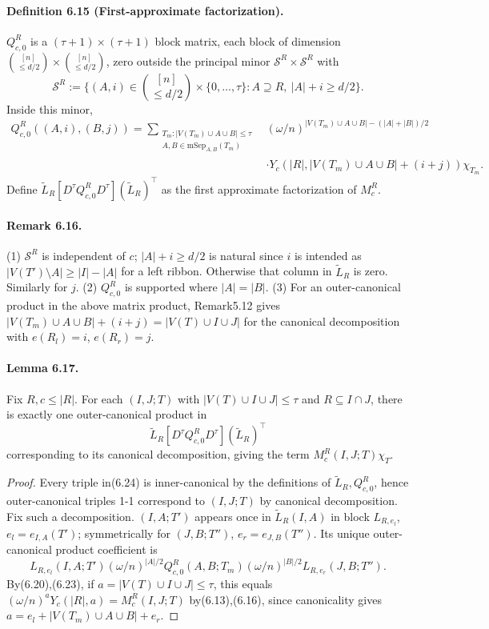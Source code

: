 \paragraph{Definition 6.15 (First-approximate factorization).} $Q_{c,0}^R$ is a $(\tau+1)\times(\tau+1)$ block matrix, each block of dimension $\binom{[n]}{\le d/2}\times\binom{[n]}{\le d/2}$, zero outside the principal minor $\mathcal S^R\times\mathcal S^R$ with
\[\mathcal S^R:=\{(A,i)\in\binom{[n]}{\le d/2}\times\{0,\ldots,\tau\}:A\supseteq R,\ |A|+i\ge d/2\}.\tag{6.22}\]
Inside this minor,
\begin{align*}Q_{c,0}^R((A,i),(B,j))=\sum_{\substack{T_m:|V(T_m)\cup A\cup B|\le\tau\\A,B\in\mathrm{mSep}_{A,B}(T_m)}}&(\omega/n)^{|V(T_m)\cup A\cup B|-(|A|+|B|)/2}\\&\cdot Y_c(|R|,|V(T_m)\cup A\cup B|+(i+j))\chi_{T_m}.\tag{6.23}\end{align*}
Define $\widetilde L_R[D^\tau Q_{c,0}^R D^\tau](\widetilde L_R)^\top$ as the first approximate factorization of $M_c^R$.
\paragraph{Remark 6.16.} (1) $\mathcal S^R$ is independent of $c$; $|A|+i\ge d/2$ is natural since $i$ is intended as $|V(T')\setminus A|\ge|I|-|A|$ for a left ribbon. Otherwise that column in $\widetilde L_R$ is zero. Similarly for $j$. (2) $Q_{c,0}^R$ is supported where $|A|=|B|$. (3) For an outer-canonical product in the above matrix product, Remark5.12 gives $|V(T_m)\cup A\cup B|+(i+j)=|V(T)\cup I\cup J|$ for the canonical decomposition with $e(R_l)=i$, $e(R_r)=j$.
\paragraph{Lemma 6.17.} Fix $R,c\le|R|$. For each $(I,J;T)$ with $|V(T)\cup I\cup J|\le\tau$ and $R\subseteq I\cap J$, there is exactly one outer-canonical product in
\[\widetilde L_R[D^\tau Q_{c,0}^R D^\tau](\widetilde L_R)^\top\tag{6.24}\]
corresponding to its canonical decomposition, giving the term $M_c^R(I,J;T)\chi_T$.
\begin{proof}Every triple in(6.24) is inner-canonical by the definitions of $\widetilde L_R,Q_{c,0}^R$, hence outer-canonical triples 1-1 correspond to $(I,J;T)$ by canonical decomposition. Fix such a decomposition. $(I,A;T')$ appears once in $\widetilde L_R(I,A)$ in block $L_{R,e_l}$, $e_l=e_{I,A}(T')$; symmetrically for $(J,B;T'')$, $e_r=e_{J,B}(T'')$. Its unique outer-canonical product coefficient is
\[L_{R,e_l}(I,A;T')(\omega/n)^{|A|/2}Q_{c,0}^R(A,B;T_m)(\omega/n)^{|B|/2}L_{R,e_r}(J,B;T'').\tag{6.25}\]
By(6.20),(6.23), if $a=|V(T)\cup I\cup J|\le\tau$, this equals $(\omega/n)^aY_c(|R|,a)=M_c^R(I,J;T)$ by(6.13),(6.16), since canonicality gives $a=e_l+|V(T_m)\cup A\cup B|+e_r$.\end{proof}
